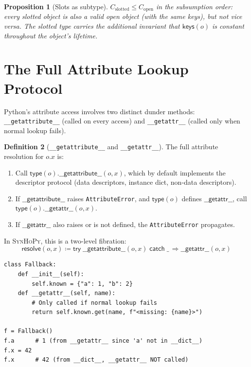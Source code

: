 \documentclass[11pt,a4paper]{report}
\theoremstyle{definition}
\newtheorem{definition}{Definition}[chapter]
\theoremstyle{plain}
\newtheorem{proposition}[definition]{Proposition}
\newcommand{\defeq}{\coloneqq}
\newcommand{\synhopy}{\textsc{SynHoPy}}
\begin{document}
\begin{proposition}[Slots as subtype]
$C_{\mathrm{slotted}} \leq C_{\mathrm{open}}$ in the subsumption order:
every slotted object is also a valid open object (with the same keys),
but not vice versa.  The slotted type carries the additional invariant that
$\mathsf{keys}(o)$ is constant throughout the object's lifetime.
\end{proposition}

\section{The Full Attribute Lookup Protocol}

Python's attribute access involves two distinct dunder methods:
\lstinline[style=python]{__getattribute__} (called on every access) and
\lstinline[style=python]{__getattr__} (called only when normal lookup fails).

\begin{definition}[\texttt{\_\_getattribute\_\_} and \texttt{\_\_getattr\_\_}]
The full attribute resolution for $o.x$ is:
\begin{enumerate}
  \item Call $\mathsf{type}(o).\mathsf{\_\_getattribute\_\_}(o, x)$, which
    by default implements the descriptor protocol (data descriptors,
    instance dict, non-data descriptors).
  \item If $\mathsf{\_\_getattribute\_\_}$ raises
    \lstinline[style=python]{AttributeError}, and $\mathsf{type}(o)$ defines
    $\mathsf{\_\_getattr\_\_}$, call $\mathsf{type}(o).\mathsf{\_\_getattr\_\_}(o, x)$.
  \item If $\mathsf{\_\_getattr\_\_}$ also raises or is not defined, the
    \lstinline[style=python]{AttributeError} propagates.
\end{enumerate}
In \synhopy{}, this is a two-level fibration:
\[
  \mathsf{resolve}(o, x) \defeq
    \mathsf{try}\;\mathsf{\_\_getattribute\_\_}(o, x)\;
    \mathsf{catch}\;\_\, \Rightarrow \mathsf{\_\_getattr\_\_}(o, x)
\]
\end{definition}

\begin{lstlisting}[style=python]
class Fallback:
    def __init__(self):
        self.known = {"a": 1, "b": 2}
    def __getattr__(self, name):
        # Only called if normal lookup fails
        return self.known.get(name, f"<missing: {name}>")

f = Fallback()
f.a      # 1 (from __getattr__ since 'a' not in __dict__)
f.x = 42
f.x      # 42 (from __dict__, __getattr__ NOT called)
\end{lstlisting}
\end{document}
